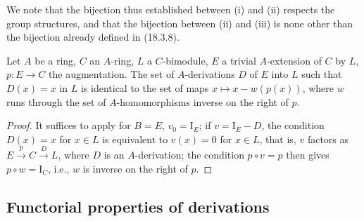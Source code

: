 We note that the bijection thus established between (i) and (ii) respects the group structures, and that the bijection between (ii) and (iii) is none other than the bijection already defined in (18.3.8).

\begin{corollary}[20.1.7]
\label{0.20.1.7}
Let $A$ be a ring, $C$ an $A$-ring, $L$ a $C$-bimodule, $E$ a trivial $A$-extension of $C$ by $L$, $p:E\to C$ the augmentation.
The set of $A$-derivations $D$ of $E$ into $L$ such that $D(x)=x$ in $L$ is identical to the set of maps $x\mapsto x-w(p(x))$, where $w$ runs through the set of $A$-homomorphisms inverse on the right of $p$.
\end{corollary}

\begin{proof}
It suffices to apply  for $B=E$, $v_0=\mathrm{I}_E$; if $v=\mathrm{I}_E-D$, the condition $D(x)=x$ for $x\in L$ is equivalent to $v(x)=0$ for $x\in L$, that is, $v$ factors as $E\xrightarrow{p}C\xrightarrow{D}L$, where $D$ is an $A$-derivation; the condition $p\circ v=p$ then gives $p\circ w=\mathrm{I}_C$, i.e., $w$ is inverse on the right of $p$.
\end{proof}

\subsection{Functorial properties of derivations}
\label{subsection:0.20.2}

